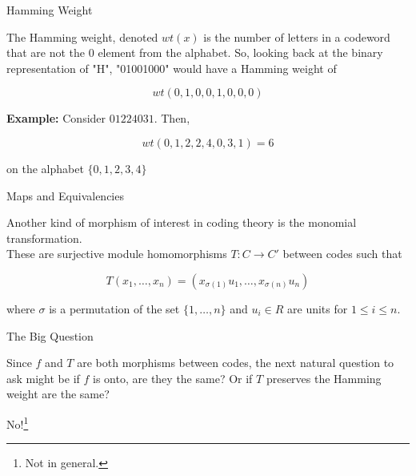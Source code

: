 \documentclass{beamer}
\begin{document}
\begin{frame}{Hamming Weight}
    
    The Hamming weight, denoted $wt(x)$ is the number of letters in a codeword that are not the $0$
    element from the alphabet. So, looking back at the binary representation of "H", "01001000" would
    have a Hamming weight of
    
    $$wt(0,1,0,0,1,0,0,0)$$

    \bigskip

    \pause

    \textbf{Example:} Consider $01224031$. Then,
    
    $$wt(0,1,2,2,4,0,3,1)=6$$
    
    on the alphabet $\{0,1,2,3,4\}$

\end{frame}

\begin{frame}{Maps and Equivalencies}
    
    Another kind of morphism of interest in coding theory is the monomial transformation.\\
    These are surjective module homomorphisms $T:C\to C'$ between codes such that

    $$T(x_1,\ldots,x_n)=(x_{\sigma(1)}u_1,\ldots,x_{\sigma(n)}u_n)$$
    
    where $\sigma$ is a permutation of the set $\{1,\ldots,n\}$ and $u_i\in R$ are units for
    $1\leq i\leq n$.

\end{frame}

\begin{frame}{The Big Question}
    
    Since $f$ and $T$ are both morphisms between codes, the next natural question to ask might be if $f$
    is onto, are they the same? Or if $T$ preserves the Hamming weight are the same?

\end{frame}

\begin{frame}
    
    \begin{center}
        No!\footnote{Not in general.}
    \end{center}

\end{frame}
\end{document}
